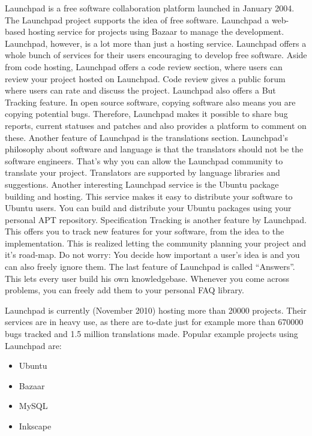 Launchpad is a free software collaboration platform launched in January 2004. The Launchpad project supports the idea of free software. Launchpad a web-based hosting service for projects using Bazaar to manage the development. Launchpad, however, is a lot more than just a hosting service. Launchpad offers a whole bunch of services for their users encouraging to develop free software. Aside from code hosting, Launchpad offers a code review section, where users can review your project hosted on Launchpad. Code review gives a public forum where users can rate and discuss the project. Launchpad also offers a But Tracking feature. In open source software, copying software also means you are copying potential bugs. Therefore, Launchpad makes it possible to share bug reports, current statuses and patches and also provides a platform to comment on these.
Another feature of Launchpad is the translations section. Launchpad's philosophy about software and language is that the translators should not be the software engineers. That's why you can allow the Launchpad community to translate your project. Translators are supported by language libraries and suggestions.
Another interesting Launchpad service is the Ubuntu package building and hosting. This service makes it easy to distribute your software to Ubuntu users. You can build and distribute your Ubuntu packages using your personal APT repository.
Specification Tracking is another feature by Launchpad. This offers you to track new features for your software, from the idea to the implementation. This is realized letting the community planning your project and it's road-map. Do not worry: You decide how important a user's idea is and you can also freely ignore them. The last feature of Launchpad is called "`Answers"'. This lets every user build his own knowledgebase. Whenever you come across problems, you can freely add them to your personal FAQ library.

Launchpad is currently (November 2010) hosting more than 20000 projects. Their services are in heavy use, as there are to-date just for example more than 670000 bugs tracked and 1.5 million translations made.
\newline
Popular example projects using Launchpad are:

\begin{itemize}
	\item Ubuntu
	\item Bazaar
	\item MySQL
	\item Inkscape
\end{itemize}

